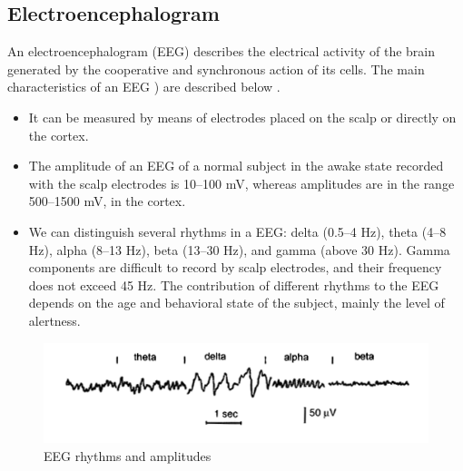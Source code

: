 


\subsection{Electroencephalogram}
\label{subsec:setup:phys-signals:eeg}

An electroencephalogram (EEG) describes the electrical activity of the brain generated by the cooperative and synchronous action of its cells. The main characteristics of an EEG ) are described below \cite{blinowska2006eeg}.
\begin{itemize}
	\item It can be measured by means of electrodes placed on the scalp or directly on the cortex.
	\item The amplitude of an EEG of a normal subject in the awake state recorded with the scalp electrodes is 10–100 mV, whereas amplitudes are in the range 500–1500 mV, in the cortex.
	\item We can distinguish several rhythms in a EEG: delta (0.5–4 Hz), theta (4–8 Hz), alpha (8–13 Hz), beta (13–30 Hz), and gamma (above 30 Hz). Gamma components are difficult to record by scalp electrodes, and their frequency does not exceed 45 Hz. The contribution of different rhythms to the EEG depends on the age and behavioral state of the subject, mainly the level of alertness.
\end{itemize}

\begin{figure}[!ht]
\centering
\includegraphics[width=\textwidth]{images/EEGrhythms.png}
\caption{EEG rhythms and amplitudes}
\label{fig:EEGrhythms}
\end{figure}



